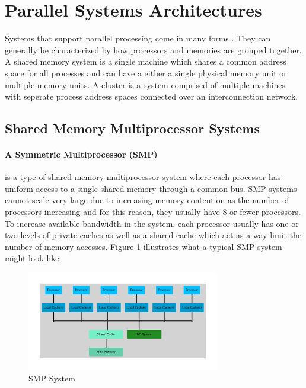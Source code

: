 \documentclass[11pt]{book}
\begin{document}
\section{Parallel Systems Architectures}

Systems that support parallel processing come in many forms \cite{culler-97,patterson-11}.  They can
generally be characterized by how processors and memories are grouped together.  A shared memory
system is a single machine which shares a common address space for all processes and can have a
either a single physical memory unit or multiple memory units.  A cluster is a system comprised of
multiple machines with seperate process address spaces connected over an interconnection network.

\subsection{Shared Memory Multiprocessor Systems}

\paragraph{A Symmetric Multiprocessor (SMP)} is a type of shared memory multiprocessor
system where each processor has uniform access to a single shared memory through a common bus.  SMP
systems cannot scale very large due to increasing memory contention as the number of processors
increasing and for this reason, they usually have 8 or fewer processors.  To increase available
bandwidth in the system, each processor usually has one or two levels of private caches as well as a
shared cache which act as a way limit the number of memory accesses.  Figure \ref{smp} illustrates
what a typical SMP system might look like.

\begin{figure}
  \centering
  \includegraphics[width=0.75\textwidth,quiet]{figs/graphviz/smp.pdf}
  \caption{SMP System}\label{smp}
\end{figure}
\end{document}
